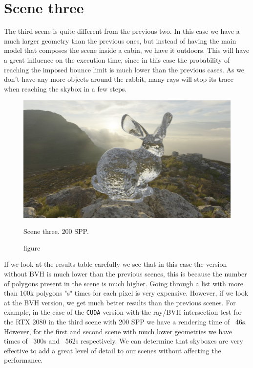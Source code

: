 \documentclass[titlepage,12pt]{report}
\begin{document}
\section{Scene three}

The third scene is quite different from the previous two. In this case we have a much larger geometry than the previous ones, but instead of having the main model that composes the scene inside a cabin, we have it outdoors. This will have a great influence on the execution time, since in this case the probability of reaching the imposed bounce limit is much lower than the previous cases. As we don't have any more objects around the rabbit, many rays will stop its trace when reaching the skybox in a few steps.


\begin{figure}[H]
	\centering
	\includegraphics[scale=0.50]{media/CapeHill_cristal_bunny_2.png}
	\caption{figure}{Scene three. 200 SPP.}
	\label{sc3}
\end{figure}

If we look at the results table carefully we see that in this case the version without BVH is much lower than the previous scenes, this is because the number of polygons present in the scene is much higher. Going through a list with more than 100k polygons "s" times for each pixel is very expensive. However, if we look at the BVH version, we get much better results than the previous scenes. For example, in the case of the \texttt{CUDA} version with the ray/BVH intersection test for the RTX 2080 in the third scene with 200 SPP we have a rendering time of ~46s. However, for the first and second scene with much lower geometries we have times of ~300s and ~562s respectively. We can determine that skyboxes are very effective to add a great level of detail to our scenes without affecting the performance.
\end{document}
